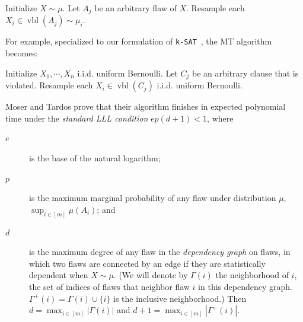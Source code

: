 \documentclass{article}
\newcommand{\ksat}{\texttt{k-SAT}~}
\newcommand{\hasDist}%
  {\sim}
\begin{document}
\begin{algorithm}[H]
\caption{The Moser-Tardos (MT) algorithm, in simple iterative form.}
\label{alg:mt}
\begin{algorithmic}
  \State Initialize $X \hasDist \mu$.
    \State Let $A_j$ be an arbitrary flaw of $X$.
    \State Resample each $X_i \in \operatorname{vbl}(A_j) \hasDist \mu_i$.
  \EndWhile
\EndFunction
\end{algorithmic}
\end{algorithm}

For example, specialized to our formulation of \ksat, the MT algorithm becomes:

\begin{algorithm}[H]
\caption{The Moser-Tardos algorithm, specialized to \ksat.}
\label{alg:mt-ksat}
\begin{algorithmic}[1]
  \State Initialize $X_1, \cdots, X_n$ i.i.d. uniform Bernoulli.
    \State Let $C_j$ be an arbitrary clause that is violated.
    \State Resample each $X_i \in \operatorname{vbl}(C_j)$ i.i.d. uniform Bernoulli.
  \EndWhile
\EndFunction

\end{algorithmic}
\end{algorithm}

Moser and Tardos prove that their algorithm finishes in expected polynomial time under the \emph{standard LLL condition} $e p (d+1) < 1$, where
\begin{description}
  \item[$e$] is the base of the natural logarithm;
  \item[$p$] is the maximum marginal probability of any flaw under distribution $\mu$, $\sup_{i \in [m]} \mu(A_i)$; and
  \item[$d$] is the maximum degree of any flaw in the \emph{dependency graph} on flaws, in which two flaws are connected by an edge if they are statistically dependent when $X \hasDist \mu$.  (We will denote by $\Gamma(i)$ the neighborhood of $i$, the set of indices of flaws that neighbor flaw $i$ in this dependency graph.  $\Gamma^{+}(i) = \Gamma(i) \cup \{i\}$ is the inclusive neighborhood.)  Then $d = \max_{i \in [m]} |\Gamma(i)|$ and $d+1 = \max_{i \in [m]} |\Gamma^{+}(i)|$.
\end{description}
\end{document}

